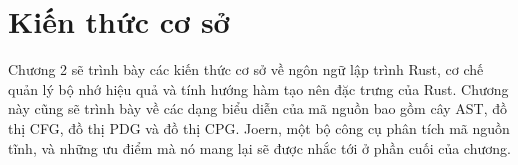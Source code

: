 \chapter{Kiến thức cơ sở}
\label{chap:background}

Chương 2 sẽ trình bày các kiến thức cơ sở về ngôn ngữ lập trình Rust, cơ chế quản lý bộ nhớ hiệu quả và tính hướng hàm tạo nên đặc trưng của Rust.
Chương này cũng sẽ trình bày về các dạng biểu diễn của mã nguồn bao gồm cây AST, đồ thị CFG, đồ thị PDG và đồ thị CPG.
Joern, một bộ công cụ phân tích mã nguồn tĩnh, và những ưu điểm mà nó mang lại sẽ được nhắc tới ở phần cuối của chương.




